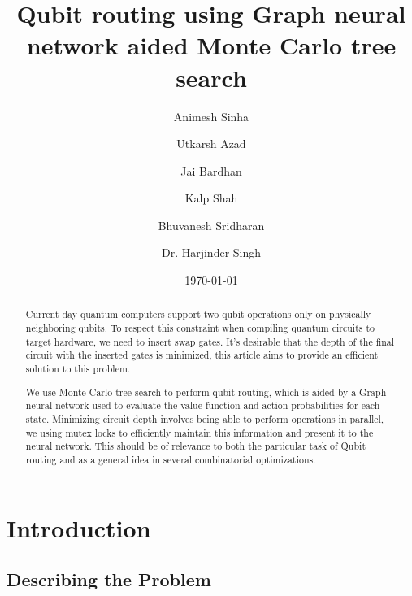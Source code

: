 \documentclass[%
 reprint,
 amsmath,amssymb,
 aps,
]{revtex4-2}
\begin{document}

\title{Qubit routing using Graph neural network aided Monte Carlo tree search}

\author{Animesh Sinha}
\author{Utkarsh Azad}
\author{Jai Bardhan}
\author{Kalp Shah}
\author{Bhuvanesh Sridharan}
\author{Dr. Harjinder Singh}
%

\date{\today}%

\begin{abstract}
    Current day quantum computers support two qubit operations only on physically neighboring qubits. To respect this constraint when compiling quantum circuits to target hardware, we need to insert swap gates. It's desirable that the depth of the final circuit with the inserted gates is minimized, this article aims to provide an efficient solution to this problem.

    We use Monte Carlo tree search to perform qubit routing, which is aided by a Graph neural network used to evaluate the value function and action probabilities for each state. Minimizing circuit depth involves being able to perform operations in parallel, we using mutex locks to efficiently maintain this information and present it to the neural network. This should be of relevance to both the particular task of Qubit routing and as a general idea in several combinatorial optimizations.
\end{abstract}

\maketitle


\section{\label{sec:intro}Introduction}

\subsection{\label{sec:intro-defn}Describing the Problem}
\end{document}
